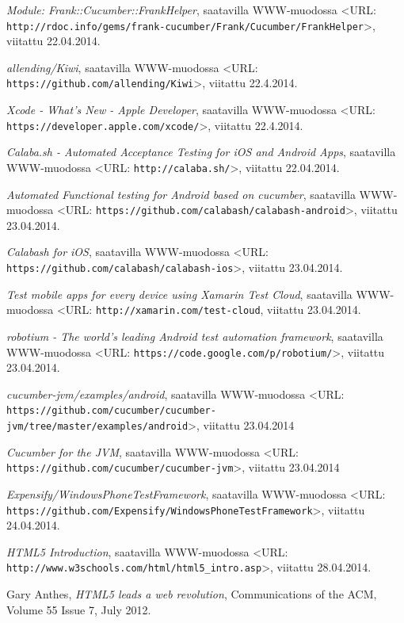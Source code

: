 \documentclass[finnish,nonumbib,nocopyright]{gradu2}
\begin{document}
\begin{thebibliography}{9}
\textit{Module: Frank::Cucumber::FrankHelper}, saatavilla WWW-muodossa
<URL: \texttt{http://rdoc.info/gems/frank-cucumber/Frank/Cucumber/FrankHelper}>, viitattu 22.04.2014.

\textit{allending/Kiwi}, saatavilla WWW-muodossa
<URL: \texttt{https://github.com/allending/Kiwi}>, viitattu 22.4.2014.

\textit{Xcode - What's New - Apple Developer}, saatavilla WWW-muodossa
<URL: \texttt{https://developer.apple.com/xcode/}>, viitattu 22.4.2014.

\textit{Calaba.sh - Automated Acceptance Testing for iOS and Android Apps}, saatavilla WWW-muodossa
<URL: \texttt{http://calaba.sh/}>, viitattu 22.04.2014.

\textit{Automated Functional testing for Android based on cucumber}, saatavilla WWW-muodossa
<URL: \texttt{https://github.com/calabash/calabash-android}>, viitattu 23.04.2014.

\textit{Calabash for iOS}, saatavilla WWW-muodossa
<URL: \texttt{https://github.com/calabash/calabash-ios}>, viitattu 23.04.2014.

\textit{Test mobile apps for every device using Xamarin Test Cloud}, saatavilla WWW-muodossa
<URL: \texttt{http://xamarin.com/test-cloud}, viitattu 23.04.2014.

\textit{robotium - The world's leading Android test automation framework}, saatavilla WWW-muodossa
<URL: \texttt{https://code.google.com/p/robotium/}>, viitattu 23.04.2014.

\textit{cucumber-jvm/examples/android}, saatavilla WWW-muodossa
<URL: \texttt{https://github.com/cucumber/cucumber-jvm/tree/master/examples/android}>, viitattu 23.04.2014

\textit{Cucumber for the JVM}, saatavilla WWW-muodossa
<URL: \texttt{https://github.com/cucumber/cucumber-jvm}>, viitattu 23.04.2014

\textit{Expensify/WindowsPhoneTestFramework}, saatavilla WWW-muodossa
<URL: \texttt{https://github.com/Expensify/WindowsPhoneTestFramework}>, viitattu 24.04.2014.

\textit{HTML5 Introduction}, saatavilla WWW-muodossa
<URL: \texttt{http://www.w3schools.com/html/html5\_intro.asp}>, viitattu 28.04.2014.

Gary Anthes, \textit{HTML5 leads a web revolution},
Communications of the ACM, Volume 55 Issue 7, July 2012.


\end{thebibliography}
\end{document}
